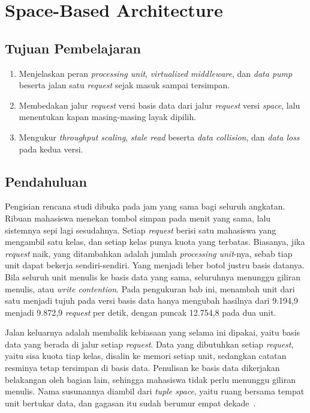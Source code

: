 \chapter{Space-Based Architecture}
\label{bab:ruang}

\section*{Tujuan Pembelajaran}

\begin{enumerate}
  \item Menjelaskan peran \textit{processing unit}, \textit{virtualized
    middleware}, dan \textit{data pump} beserta jalan satu \textit{request}
    sejak masuk sampai tersimpan.
  \item Membedakan jalur \textit{request} versi basis data dari jalur
    \textit{request} versi \textit{space}, lalu menentukan kapan
    masing-masing layak dipilih.
  \item Mengukur \textit{throughput scaling}, \textit{stale read} beserta
    \textit{data collision}, dan \textit{data loss} pada kedua versi.
\end{enumerate}

\section{Pendahuluan}

Pengisian rencana studi dibuka pada jam yang sama bagi seluruh angkatan.
Ribuan mahasiswa menekan tombol simpan pada menit yang sama, lalu sistemnya
sepi lagi sesudahnya. Setiap \textit{request} berisi satu mahasiswa yang
mengambil satu kelas, dan setiap kelas punya kuota yang terbatas. Biasanya,
jika \textit{request} naik, yang ditambahkan adalah jumlah
\textit{processing unit}-nya, sebab tiap
unit dapat bekerja sendiri-sendiri.
Yang menjadi leher botol justru basis datanya. Bila seluruh unit menulis ke
basis data yang sama, seluruhnya menunggu giliran menulis, atau
\textit{write contention}. Pada
pengukuran bab ini, menambah unit dari satu menjadi tujuh pada versi basis
data hanya mengubah hasilnya dari 9.194,9 menjadi 9.872,9 \textit{request}
per detik, dengan puncak 12.754,8 pada dua unit.

Jalan keluarnya adalah membalik kebiasaan yang selama ini dipakai, yaitu basis
data yang berada di jalur setiap \textit{request}. Data yang dibutuhkan setiap
\textit{request}, yaitu sisa kuota tiap kelas, disalin ke memori setiap unit,
sedangkan catatan resminya tetap tersimpan di basis data. Penulisan ke basis
data dikerjakan belakangan oleh bagian lain, sehingga mahasiswa tidak perlu
menunggu giliran menulis. Nama susunannya diambil dari \textit{tuple
space},
yaitu ruang bersama tempat unit bertukar data, dan gagasan itu sudah berumur
empat dekade~\cite{gelernter1985linda}.

